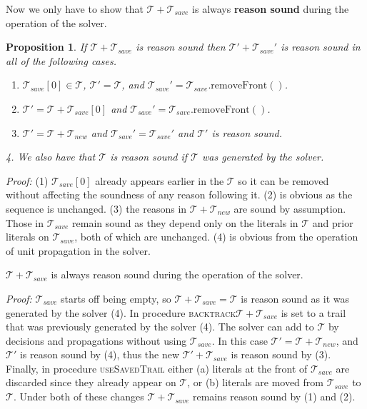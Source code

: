 \documentclass[runningheads]{llncs}
\newcommand{\trail}{\ensuremath{\mathcal{T}}}
\newcommand{\trailsave}{\trail_{\mathit{save}}}
\newcommand{\bt}{\textsc{backtrack}\xspace}
\newcommand{\ust}{\textsc{useSavedTrail}\xspace}
\newtheorem{prop}{Proposition}
\newcommand{\whitebox}{\raisebox{.5ex}{\fbox{\hspace*{.2ex}}}}
\begin{document}
Now we only have to show that $\trail+\trailsave$ is always
\textbf{reason sound} during the operation of the solver.
\begin{prop}
    \label{prop:sound}
    If $\trail+\trailsave$ is reason sound then $\trail'+\trailsave'$
    is reason sound in all of the following cases.
    \begin{enumerate}
    \item $\trailsave[0]\in \trail$, $\trail'=\trail$, and
        $\trailsave' = \trailsave.\mathrm{removeFront()}$.
    \item $\trail' = \trail+\trailsave[0]$ and
        $\trailsave' = \trailsave.\mathrm{removeFront()}$.
    \item $\trail' = \trail + \trail_{\mathit{new}}$ and
        $\trailsave' = \trailsave'$ and $\trail'$ is reason sound.
    \end{enumerate}
    4. We also have that $\trail$ is reason sound if $\trail$ was
    generated by the solver.
\end{prop}
\noindent \emph{Proof:} (1) $\trailsave[0]$ already appears earlier in
the $\trail$ so it can be removed without affecting the soundness of
any reason following it. (2) is obvious as the sequence is
unchanged. (3) the reasons in $\trail+\trail_{\mathit{new}}$ are sound
by assumption. Those in $\trailsave$ remain sound as they depend only
on the literals in $\trail$ and prior literals on $\trailsave$, both
of which are unchanged. (4) is obvious from the operation of unit
propagation in the solver.  \whitebox

\begin{theorem}
    \label{thm:rsound}
    $\trail+\trailsave$ is always reason sound during the operation of
    the solver.
\end{theorem}
\noindent \emph{Proof:} $\trailsave$ starts off being empty, so
$\trail+\trailsave = \trail$ is reason sound as it was generated by
the solver (4). In procedure \bt $\trail+\trailsave$ is
set to a trail that was previously generated by the solver (4). The solver
can add to $\trail$ by decisions and propagations without using
$\trailsave$. In this case $\trail' = \trail+\trail_{\mathit{new}}$,
and $\trail'$ is reason sound by (4), thus the new
$\trail'+\trailsave$ is reason sound by (3). Finally, in procedure
\ust either (a) literals at the front of
$\trailsave$ are discarded since they already appear on $\trail$, or
(b) literals are moved from $\trailsave$ to $\trail$. Under both of
these changes $\trail+\trailsave$ remains reason sound by (1) and (2).
\whitebox
\end{document}
